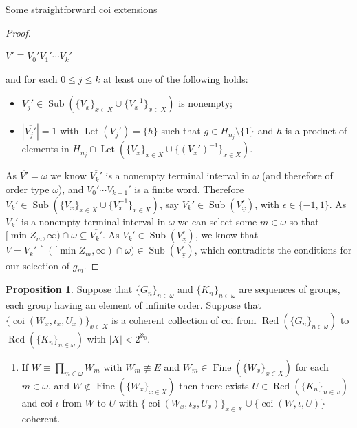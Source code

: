 \documentclass{amsart}
\theoremstyle{definition}\newtheorem{theorem}{Theorem}
\theoremstyle{definition}\newtheorem*{A}{Main Theorem}
\theoremstyle{definition}\newtheorem*{B}{Theorem \ref{elementaryequiv}}
\theoremstyle{definition}\newtheorem*{C}{Theorem \ref{continuous}}
\theoremstyle{definition}\newtheorem*{D}{Theorem \ref{bigisomorphism2}}
\theoremstyle{definition}\newtheorem{bigtheorem}{Main Theorem}
\numberwithin{theorem}{section}
\theoremstyle{definition}\newtheorem{corollary}[theorem]{Corollary}
\theoremstyle{definition}\newtheorem{proposition}[theorem]{Proposition}
\theoremstyle{definition}\newtheorem{definition}[theorem]{Definition}
\theoremstyle{definition}\newtheorem{question}[theorem]{Question}
\theoremstyle{definition}\newtheorem{example}[theorem]{Example}
\theoremstyle{definition}\newtheorem{remark}[theorem]{Remark}
\theoremstyle{definition}\newtheorem{note}[theorem]{Note}
\theoremstyle{definition}\newtheorem{lemma}[theorem]{Lemma}
\theoremstyle{definition}\newtheorem{fact}[theorem]{Fact}
\theoremstyle{definition}\newtheorem{define}[theorem]{Definition}
\theoremstyle{definition}\newtheorem{claim}[theorem]{Claim}
\theoremstyle{definition}\newtheorem{obs}[theorem]{Observation}
\theoremstyle{definition}\newtheorem{definitions}[theorem]{Definitions}
\newcommand{\Red}{\operatorname{Red}}
\newcommand{\Let}{\operatorname{Let}}
\newcommand{\Sub}{\operatorname{Sub}}
\newcommand{\Fine}{\operatorname{Fine}}
\newcommand{\coi}{\operatorname{coi}}
\begin{document}
\begin{section}{Some straightforward coi extensions}
\begin{proof}
\begin{center}
$V' \equiv V_0'V_1' \cdots V_k'$
\end{center}

\noindent and for each $0 \leq j \leq k$ at least one of the following holds:

\begin{itemize}
\item $V_j' \in \Sub(\{V_x\}_{x \in X} \cup \{V_x^{-1}\}_{x \in X})$ is nonempty;

\item $|\overline{V_j'}| = 1$ with $\Let(V_j') = \{h\}$ such that $g \in H_{n_j}\setminus \{1\}$ and $h$ is a product of elements in $H_{n_j} \cap \Let(\{V_x\}_{x \in X} \cup \{(V_x')^{-1}\}_{x \in X})$.

\end{itemize}


\noindent As $\overline{V'} = \omega$ we know $\overline{V_k'}$ is a nonempty terminal interval in $\omega$ (and therefore of order type $\omega$), and $V_0'\cdots V_{k-1}'$ is a finite word.  Therefore $V_k' \in \Sub(\{V_x\}_{x \in X} \cup \{V_x^{-1}\}_{x \in X})$, say $V_k' \in \Sub(V_{\underline{x}}^{\epsilon})$, with $\epsilon \in \{-1,1\}$.  As $\overline{V_k'}$ is a nonempty terminal interval in $\omega$ we can select some $m \in \omega$ so that $[\min Z_m, \infty)\cap \omega \subseteq \overline{V_k'}$.  As $V_k' \in \Sub(V_{\underline{x}}^{\epsilon})$, we know that $V = V_k' \upharpoonright ([\min Z_m, \infty) \cap \omega) \in \Sub(V_{\underline{x}}^{\epsilon})$, which contradicts the conditions for our selection of $g_m$.



\end{proof}


\begin{proposition}\label{omegatypeconcat}  Suppose that $\{G_n\}_{n \in \omega}$ and $\{K_n\}_{n \in \omega}$ are sequences of groups, each group having an element of infinite order.  Suppose that $\{\coi(W_x, \iota_x, U_x)\}_{x \in X}$ is a coherent collection of coi from $\Red(\{G_n\}_{n \in \omega})$ to $\Red(\{K_n\}_{n \in \omega})$ with $|X|<2^{\aleph_0}$.

\begin{enumerate}

\item If $W \equiv \prod_{m \in \omega} W_m$ with $W_m \not\equiv E$ and $W_m \in\Fine(\{W_x\}_{x \in X})$ for each $m \in \omega$, and $W \notin \Fine(\{W_x\}_{x \in X})$ then there exists $U \in \Red(\{K_n\}_{n \in \omega})$ and coi $\iota$ from $W$ to $U$ with $\{\coi(W_x, \iota_x, U_x)\}_{x \in X} \cup \{\coi(W, \iota, U)\}$ coherent.



\end{enumerate}
\end{proposition}
\end{section}
\end{document}
